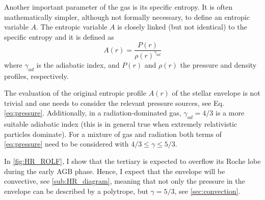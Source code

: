 Another important parameter of the gas is its specific entropy. It is often mathematically simpler, although not formally necessary, to define an entropic variable $A$. The entropic variable $A$ is closely linked (but not identical) to the specific entropy and it is defined as
\begin{equation}\label{eq:entropic_variable}
    A(r) = \frac{P(r)}{\rho(r)^{\gamma_{ad}}}
\end{equation}
where $\gamma_{ad}$ is the adiabatic index, and $P(r)$ and $\rho(r)$ the pressure and density profiles, respectively. 

The evaluation of the original entropic profile $A(r)$ of the stellar envelope is not trivial and one needs to consider the relevant pressure sources, see Eq. \eqref{eq:pressure}. Additionally, in a radiation-dominated gas, $\gamma_{ad} = 4/3$ is a more suitable adiabatic index (this is in general true when extremely relativistic particles dominate). For a mixture of gas and radiation both terms of \cref{eq:pressure} need to be considered with $4/3 \leq \gamma \leq 5/3$.

In \cref{fig:HR_ROLF}, I show that the tertiary is expected to overflow its Roche lobe during the early AGB phase. Hence, I expect that the envelope will be convective, see \cref{sub:HR_diagram}, meaning that not only the pressure in the envelope can be described by a polytrope, but $\gamma=5/3$, see \cref{sec:convection}.

